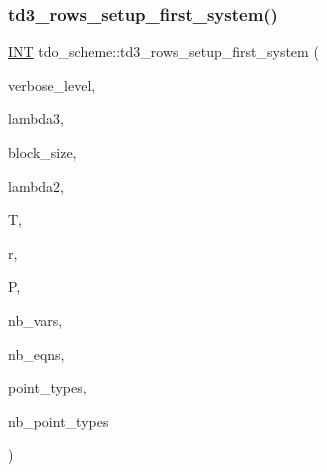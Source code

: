 \subsubsection{\texorpdfstring{td3\+\_\+rows\+\_\+setup\+\_\+first\+\_\+system()}{td3\_rows\_setup\_first\_system()}}
{\footnotesize\ttfamily \mbox{\hyperlink{galois_8h_a09fddde158a3a20bd2dcadb609de11dc}{I\+NT}} tdo\+\_\+scheme\+::td3\+\_\+rows\+\_\+setup\+\_\+first\+\_\+system (\begin{DoxyParamCaption}\item[{\mbox{\hyperlink{galois_8h_a09fddde158a3a20bd2dcadb609de11dc}{I\+NT}}}]{verbose\+\_\+level,  }\item[{\mbox{\hyperlink{galois_8h_a09fddde158a3a20bd2dcadb609de11dc}{I\+NT}}}]{lambda3,  }\item[{\mbox{\hyperlink{galois_8h_a09fddde158a3a20bd2dcadb609de11dc}{I\+NT}}}]{block\+\_\+size,  }\item[{\mbox{\hyperlink{galois_8h_a09fddde158a3a20bd2dcadb609de11dc}{I\+NT}}}]{lambda2,  }\item[{\mbox{\hyperlink{classtdo__data}{tdo\+\_\+data}} \&}]{T,  }\item[{\mbox{\hyperlink{galois_8h_a09fddde158a3a20bd2dcadb609de11dc}{I\+NT}}}]{r,  }\item[{\mbox{\hyperlink{classpartitionstack}{partitionstack}} \&}]{P,  }\item[{\mbox{\hyperlink{galois_8h_a09fddde158a3a20bd2dcadb609de11dc}{I\+NT}} \&}]{nb\+\_\+vars,  }\item[{\mbox{\hyperlink{galois_8h_a09fddde158a3a20bd2dcadb609de11dc}{I\+NT}} \&}]{nb\+\_\+eqns,  }\item[{\mbox{\hyperlink{galois_8h_a09fddde158a3a20bd2dcadb609de11dc}{I\+NT}} $\ast$\&}]{point\+\_\+types,  }\item[{\mbox{\hyperlink{galois_8h_a09fddde158a3a20bd2dcadb609de11dc}{I\+NT}} \&}]{nb\+\_\+point\+\_\+types }\end{DoxyParamCaption})}

\mbox{\label{classtdo__scheme_a6ce853f830a7e1671148a41601be26e9}} 

